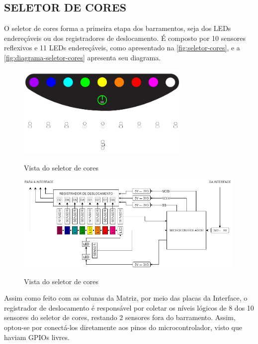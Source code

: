 \subsection{SELETOR DE CORES}
\label{subse:seletor}

O seletor de cores forma a primeira etapa dos barramentos, seja dos LEDs endereçáveis ou dos registradores de deslocamento. É composto por 10 sensores reflexivos e 11 LEDs endereçáveis, como apresentado na \autoref{fig:seletor-cores}, e a \autoref{fig:diagrama-seletor-cores} apresenta seu diagrama.

\begin{figure}[H]
    \centering
    \caption{Vista do seletor de cores}
    \includegraphics[width=0.75\textwidth]{./dados/figuras/seletor-cores}
    \label{fig:seletor-cores}
\end{figure}

\begin{figure}[H]
    \centering
    \caption{Vista do seletor de cores}
    \includegraphics[width=0.99\textwidth]{./dados/figuras/diagrama-seletor-cores}
    \label{fig:diagrama-seletor-cores}
\end{figure}

Assim como feito com as colunas da Matriz, por meio das placas da Interface, o registrador de deslocamento é responsável por coletar os níveis lógicos de 8 dos 10 sensores do seletor de cores, restando 2 sensores fora do barramento. Assim, optou-se por conectá-los diretamente aos pinos do microcontrolador, visto que haviam GPIOs livres.

